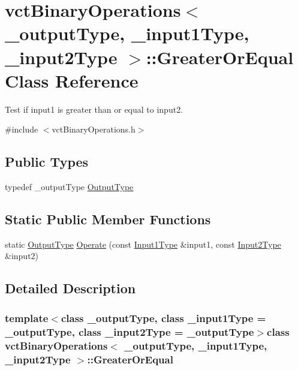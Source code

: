 \hypertarget{classvct_binary_operations_1_1_greater_or_equal}{\section{vct\-Binary\-Operations$<$ \-\_\-output\-Type, \-\_\-input1\-Type, \-\_\-input2\-Type $>$\-:\-:Greater\-Or\-Equal Class Reference}
\label{classvct_binary_operations_1_1_greater_or_equal}
}


Test if input1 is greater than or equal to input2.  




{\ttfamily \#include $<$vct\-Binary\-Operations.\-h$>$}

\subsection*{Public Types}
\begin{DoxyCompactItemize}
\item 
typedef \-\_\-output\-Type \hyperlink{classvct_binary_operations_1_1_greater_or_equal_aeb46d29e2a560982db8181d297538b4b}{Output\-Type}
\end{DoxyCompactItemize}
\subsection*{Static Public Member Functions}
\begin{DoxyCompactItemize}
\item 
static \hyperlink{classvct_binary_operations_1_1_greater_or_equal_aeb46d29e2a560982db8181d297538b4b}{Output\-Type} \hyperlink{classvct_binary_operations_1_1_greater_or_equal_aa156cb77e1aca08bde00f5042edfb878}{Operate} (const \hyperlink{classvct_binary_operations_a5e56a66a012d6a28c539a08a0021c45e}{Input1\-Type} \&input1, const \hyperlink{classvct_binary_operations_a929119af557a04a16b4d854981e49e1b}{Input2\-Type} \&input2)
\end{DoxyCompactItemize}


\subsection{Detailed Description}
\subsubsection*{template$<$class \-\_\-output\-Type, class \-\_\-input1\-Type = \-\_\-output\-Type, class \-\_\-input2\-Type = \-\_\-output\-Type$>$class vct\-Binary\-Operations$<$ \-\_\-output\-Type, \-\_\-input1\-Type, \-\_\-input2\-Type $>$\-::\-Greater\-Or\-Equal}

